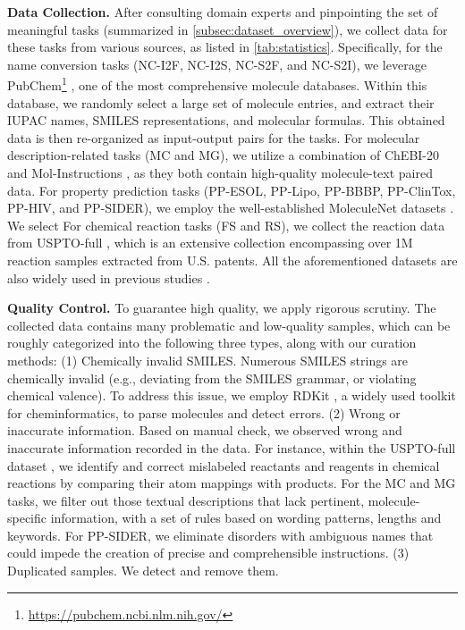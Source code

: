 \noindent \textbf{Data Collection.} After consulting domain experts and pinpointing the set of meaningful tasks (summarized in \cref{subsec:dataset_overview}), we collect data for these tasks from various sources, as listed in \cref{tab:statistics}. 
Specifically, for the {name conversion} tasks (NC-I2F, NC-I2S, NC-S2F, and NC-S2I), we leverage PubChem\footnote{\url{https://pubchem.ncbi.nlm.nih.gov/}} \citep{kim2019pubchem}, one of the most comprehensive molecule databases. Within this database, we randomly select a large set of molecule entries, and extract their {IUPAC} names, {SMILES} representations, and molecular formulas. This obtained data is then re-organized as input-output pairs for the tasks. 
For molecular description-related tasks (MC and MG), we utilize a combination of ChEBI-20 \citep{edwards2021text2mol,edwards2022translation} and Mol-Instructions \citep{fang2023mol}, as they both contain high-quality molecule-text paired data. 
For property prediction tasks (PP-ESOL, PP-Lipo, PP-BBBP, PP-ClinTox, PP-HIV, and PP-SIDER), we employ the well-established MoleculeNet datasets \citep{wu2018moleculenet}. We select 
For chemical reaction tasks (FS and RS), we collect the reaction data from USPTO-full \citep{Lowe2017}, which is an extensive collection encompassing over 1M reaction samples extracted from U.S. patents.
All the aforementioned datasets are also widely used in previous studies \citep{he2021molecular,Zhong2022,edwards2022translation,irwin2022chemformer,chen2023g2retro,zhou2023unimol}.

\noindent \textbf{Quality Control.}
To guarantee high quality, we apply rigorous scrutiny. 
The collected data contains many problematic and low-quality samples, which can be roughly categorized into the following three types, along with our curation methods:
(1) Chemically invalid SMILES. Numerous SMILES strings are chemically invalid (e.g., deviating from the SMILES grammar, or violating chemical valence). To address this issue, we employ RDKit \citep{rdkit}, a widely used toolkit for cheminformatics, to parse molecules and detect errors.
(2) Wrong or inaccurate information. Based on manual check, we observed wrong and inaccurate information recorded in the data. 
For instance, within the USPTO-full dataset \citep{Lowe2017}, we identify and correct mislabeled reactants and reagents in chemical reactions by comparing their atom mappings with products.
For the MC and MG tasks, we filter out those textual descriptions that 
lack pertinent, molecule-specific information, with a set of rules based on wording patterns, lengths and keywords. 
For PP-SIDER, we eliminate disorders with ambiguous names that could impede the creation of precise and comprehensible instructions.
(3) Duplicated samples. We detect and remove them.

